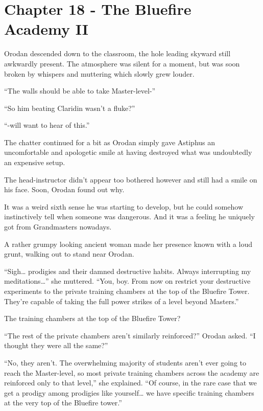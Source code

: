 \documentclass[a4paper,10pt]{book}
\begin{document}
\section*{Chapter 18 - The Bluefire Academy II}
%
\par
Orodan descended down to the classroom, the hole leading skyward still awkwardly present. The atmosphere was silent for a moment, but was soon broken by whispers and muttering which slowly grew louder.\par
“The walls should be able to take Master-level-”\par
“So him beating Claridin wasn’t a fluke?”\par
“-will want to hear of this.”\par
The chatter continued for a bit as Orodan simply gave Astiphus an uncomfortable and apologetic smile at having destroyed what was undoubtedly an expensive setup.\par
The head-instructor didn’t appear too bothered however and still had a smile on his face. Soon, Orodan found out why.\par
It was a weird sixth sense he was starting to develop, but he could somehow instinctively tell when someone was dangerous. And it was a feeling he uniquely got from Grandmasters nowadays.\par
A rather grumpy looking ancient woman made her presence known with a loud grunt, walking out to stand near Orodan.\par
“Sigh… prodigies and their damned destructive habits. Always interrupting my meditations…” she muttered. “You, boy. From now on restrict your destructive experiments to the private training chambers at the top of the Bluefire Tower. They’re capable of taking the full power strikes of a level beyond Masters.”\par
The training chambers at the top of the Bluefire Tower?\par
“The rest of the private chambers aren’t similarly reinforced?” Orodan asked. “I thought they were all the same?”\par
“No, they aren’t. The overwhelming majority of students aren’t ever going to reach the Master-level, so most private training chambers across the academy are reinforced only to that level,” she explained. “Of course, in the rare case that we get a prodigy among prodigies like yourself… we have specific training chambers at the very top of the Bluefire tower.”\par
\end{document}
